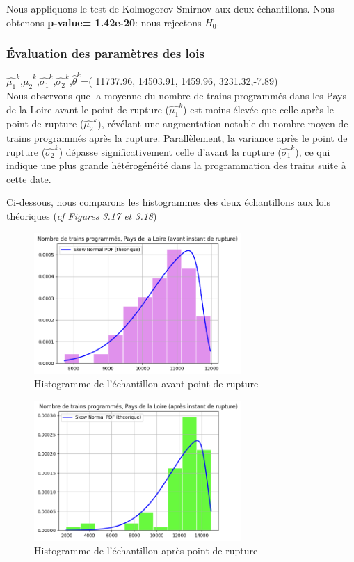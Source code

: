 {Nous appliquons le test de Kolmogorov-Smirnov aux deux échantillons. Nous obtenons \textbf{p-value= 1.42e-20}: nous rejectons $H_0$.

\subsubsection{Évaluation des paramètres des lois}

$\hat{\mu_1}^k$,$\hat{\mu_2}^k$,$\hat{\sigma_1}^k$,$\hat{\sigma_2}^k$,$\hat{\theta}^k$=( 11737.96, 14503.91, 1459.96, 3231.32,-7.89)\\
 
Nous observons que la moyenne du nombre de trains programmés dans les Pays de la Loire avant le point de rupture ($\hat{\mu_1}^k$) est moins élevée que celle après le point de rupture ($\hat{\mu_2}^k$), révélant une augmentation notable du nombre moyen de trains programmés après la rupture. Parallèlement, la variance après le point de rupture ($\hat{\sigma_2}^k$) dépasse significativement celle d'avant la rupture ($\hat{\sigma_1}^k$), ce qui indique une plus grande hétérogénéité dans la programmation des trains suite à cette date. 


Ci-dessous, nous comparons les histogrammes des deux échantillons aux lois théoriques (\textit{cf Figures 3.17 et 3.18})

\begin{figure}[H]
  \centering
  \includegraphics[width=0.7\textwidth]{image/PL-FIG04.png}
  \caption{Histogramme de l'échantillon avant point de rupture}
\end{figure}

\begin{figure}[H]
  \centering
  \includegraphics[width=0.7\textwidth]{image/PL-FIG05.png}
  \caption{Histogramme de l'échantillon après point de rupture}
\end{figure}

}
